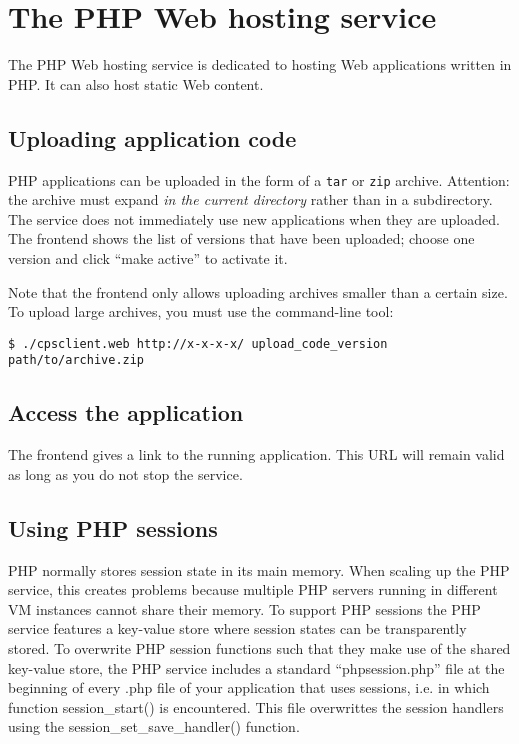 \documentclass[10pt]{article}
\begin{document}
\section{The PHP Web hosting service}

The PHP Web hosting service is dedicated to hosting Web applications
written in PHP. It can also host static Web content.

\subsection{Uploading application code}

PHP applications can be uploaded in the form of a \texttt{tar} or
\texttt{zip} archive.  Attention: the archive must expand \emph{in the
  current directory} rather than in a subdirectory. The service does
not immediately use new applications when they are uploaded. The
frontend shows the list of versions that have been uploaded; choose
one version and click ``make active'' to activate it.

Note that the frontend only allows uploading archives smaller than a
certain size.  To upload large archives, you must use the command-line
tool:
\begin{verbatim}
$ ./cpsclient.web http://x-x-x-x/ upload_code_version path/to/archive.zip
\end{verbatim}

\subsection{Access the application}

The frontend gives a link to the running application. This URL will
remain valid as long as you do not stop the service.

\subsection{Using PHP sessions}

PHP normally stores session state in its main memory. When scaling up
the PHP service, this creates problems because multiple PHP servers
running in different VM instances cannot share their memory. To
support PHP sessions the PHP service features a key-value store where
session states can be transparently stored. To overwrite PHP session
functions such that they make use of the shared key-value store, the
PHP service includes a standard ``phpsession.php'' file at the
beginning of every .php file of your application that uses sessions,
i.e. in which function session\_start() is encountered.  This file
overwrittes the session handlers using the
session\_set\_save\_handler() function.
\end{document}
